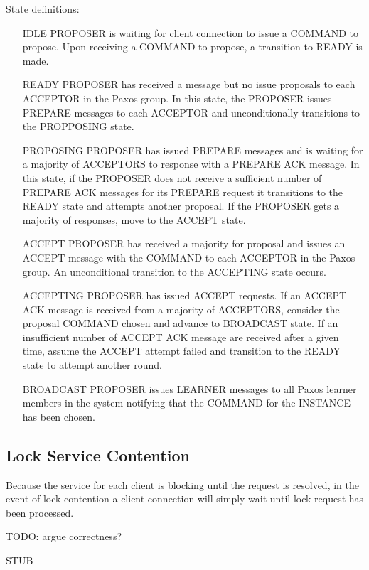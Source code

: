 \documentclass{article}
\begin{document}
State definitions:
\begin{itemize}
\item[IDLE] PROPOSER is waiting for client connection to issue a COMMAND to propose. 
  Upon receiving a COMMAND to propose, a transition to READY is made.
\item[READY] PROPOSER has received a message but no issue proposals to each ACCEPTOR in the Paxos group.
  In this state, the PROPOSER issues PREPARE messages to each ACCEPTOR and unconditionally transitions to the PROPPOSING state.
\item[PROPOSING] PROPOSER has issued PREPARE messages and is waiting for a majority of ACCEPTORS to response with a PREPARE ACK message.
  In this state, if the PROPOSER does not receive a sufficient number of PREPARE ACK messages for its PREPARE request it transitions to the READY state and attempts another proposal.
  If the PROPOSER gets a majority of responses, move to the ACCEPT state.
\item[ACCEPT] PROPOSER has received a majority for proposal and issues an ACCEPT message with the COMMAND to each ACCEPTOR in the Paxos group. 
  An unconditional transition to the ACCEPTING state occurs.
\item[ACCEPTING] PROPOSER has issued ACCEPT requests. 
  If an ACCEPT ACK message is received from a majority of ACCEPTORS, consider the proposal COMMAND chosen and advance to BROADCAST state.
 If an insufficient number of ACCEPT ACK message are received after a given time, assume the ACCEPT attempt failed and transition to the READY state to attempt another round. 
\item[BROADCAST] PROPOSER issues LEARNER messages to all Paxos learner members in the system notifying that the COMMAND for the INSTANCE has been chosen.
\end{itemize}

\subsection{Lock Service Contention}

Because the service for each client is blocking until the request is resolved, in the event of lock contention a client connection will simply wait until lock request has been processed.

TODO: argue correctness?

STUB




\end{document}
